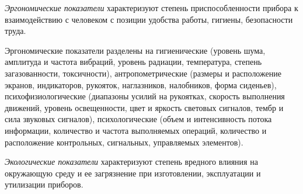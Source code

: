 \textit{Эргономические показатели} характеризуют степень приспособленности прибора к взаимодействию с человеком с позиции удобства работы, гигиены, безопасности труда. 

Эргономические показатели разделены на гигиенические (уровень шума, амплитуда и частота вибраций, уровень радиации, температура, степень загазованности, токсичности), антропометрические (размеры и расположение экранов, индикаторов, рукояток, наглазников, налобников, форма сиденьев), психофизиологические (диапазоны усилий на рукоятках, скорость выполнения движений, уровень освещенности, цвет и яркость световых сигналов, тембр и сила звуковых сигналов), психологические (объем и интенсивность потока информации, количество и частота выполняемых операций, количество и расположение контрольных, сигнальных, управляемых элементов).

\textit{Экологические показатели} характеризуют степень вредного влияния на окружающую среду и ее загрязнение при изготовлении, эксплуатации и утилизации приборов.
